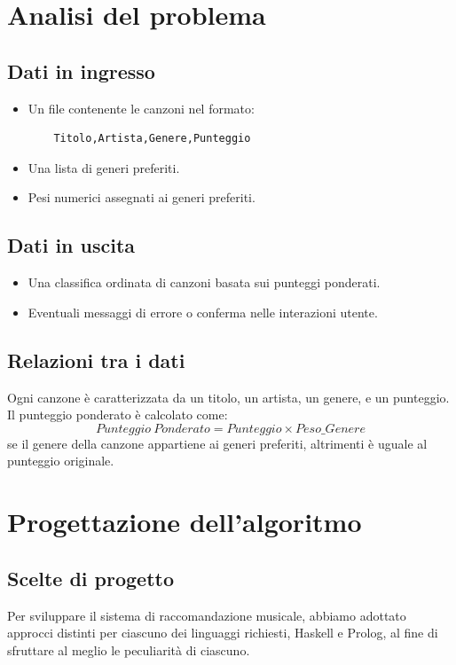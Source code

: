 \documentclass[a4paper,11pt]{article}
\begin{document}
\newpage
\section{Analisi del problema}
\subsection{Dati in ingresso}
\begin{itemize}
    \item Un file contenente le canzoni nel formato:
    \begin{verbatim}
    Titolo,Artista,Genere,Punteggio
    \end{verbatim}
    \item Una lista di generi preferiti.
    \item Pesi numerici assegnati ai generi preferiti.
\end{itemize}

\subsection{Dati in uscita}
\begin{itemize}
    \item Una classifica ordinata di canzoni basata sui punteggi ponderati.
    \item Eventuali messaggi di errore o conferma nelle interazioni utente.
\end{itemize}

\subsection{Relazioni tra i dati}
Ogni canzone è caratterizzata da un titolo, un artista, un genere, e un punteggio. Il punteggio ponderato è calcolato come:
\[
Punteggio\ Ponderato = Punteggio \times Peso\_{Genere}
\]
se il genere della canzone appartiene ai generi preferiti, altrimenti è uguale al punteggio originale.

\newpage
\section{Progettazione dell'algoritmo}
\subsection{Scelte di progetto}
Per sviluppare il sistema di raccomandazione musicale, abbiamo adottato approcci distinti per ciascuno dei linguaggi richiesti, Haskell e Prolog, al fine di sfruttare al meglio le peculiarità di ciascuno.
\end{document}
